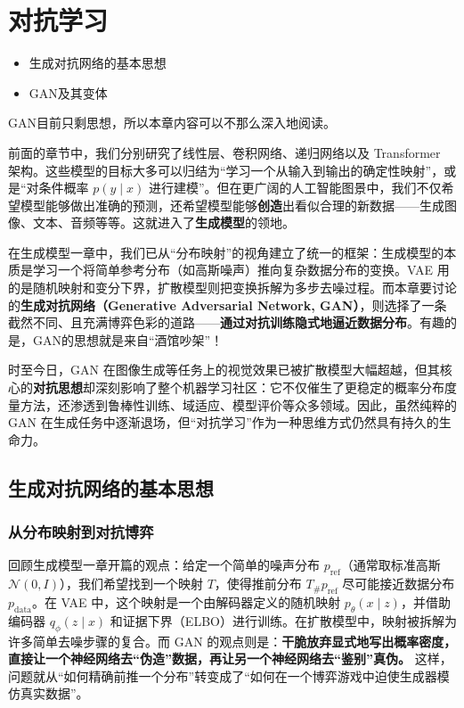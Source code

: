 \chapter{对抗学习}

\begin{intro}
    \begin{itemize}
        \item 生成对抗网络的基本思想
        \item GAN及其变体
    \end{itemize}
    GAN目前只剩思想，所以本章内容可以不那么深入地阅读。
\end{intro}

前面的章节中，我们分别研究了线性层、卷积网络、递归网络以及 Transformer 架构。这些模型的目标大多可以归结为“学习一个从输入到输出的确定性映射”，或是“对条件概率 $p(y\mid x)$ 进行建模”。但在更广阔的人工智能图景中，我们不仅希望模型能够做出准确的预测，还希望模型能够\textbf{创造}出看似合理的新数据——生成图像、文本、音频等等。这就进入了\textbf{生成模型}的领地。

在生成模型一章中，我们已从“分布映射”的视角建立了统一的框架：生成模型的本质是学习一个将简单参考分布（如高斯噪声）推向复杂数据分布的变换。VAE 用的是随机映射和变分下界，扩散模型则把变换拆解为多步去噪过程。而本章要讨论的\textbf{生成对抗网络（Generative Adversarial Network, GAN）}，则选择了一条截然不同、且充满博弈色彩的道路——\textbf{通过对抗训练隐式地逼近数据分布}。有趣的是，GAN的思想就是来自“酒馆吵架”！

时至今日，GAN 在图像生成等任务上的视觉效果已被扩散模型大幅超越，但其核心的\textbf{对抗思想}却深刻影响了整个机器学习社区：它不仅催生了更稳定的概率分布度量方法，还渗透到鲁棒性训练、域适应、模型评价等众多领域。因此，虽然纯粹的 GAN 在生成任务中逐渐退场，但“对抗学习”作为一种思维方式仍然具有持久的生命力。

\section{生成对抗网络的基本思想}

\subsection{从分布映射到对抗博弈}

回顾生成模型一章开篇的观点：给定一个简单的噪声分布 $p_{\text{ref}}$（通常取标准高斯 $\mathcal N(0,I)$），我们希望找到一个映射 $T$，使得推前分布 $T_\# p_{\text{ref}}$ 尽可能接近数据分布 $p_{\text{data}}$。在 VAE 中，这个映射是一个由解码器定义的随机映射 $p_\theta(x\mid z)$，并借助编码器 $q_\phi(z\mid x)$ 和证据下界（ELBO）进行训练。在扩散模型中，映射被拆解为许多简单去噪步骤的复合。而 GAN 的观点则是：\textbf{干脆放弃显式地写出概率密度，直接让一个神经网络去“伪造”数据，再让另一个神经网络去“鉴别”真伪。} 这样，问题就从“如何精确前推一个分布”转变成了“如何在一个博弈游戏中迫使生成器模仿真实数据”。

